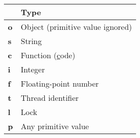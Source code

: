 \begin{tabular}{|l|X|}
\hline
            & \textbf{Type} \\
\hline\hline
\textbf{o}  & Object (primitive value ignored) \\
\hline
\textbf{s}  & String \\
\hline
\textbf{c}  & Function (\underline{c}ode) \\
\hline
\textbf{i}  & Integer \\
\hline
\textbf{f}  & Floating-point number \\
\hline
\textbf{t}  & Thread identifier \\
\hline
\textbf{l}  & Lock \\
\hline
\textbf{p}  & Any primitive value \\
\hline
\end{tabular}
